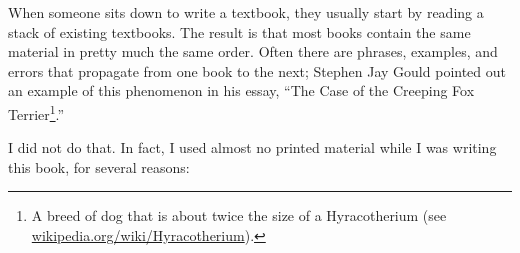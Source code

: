 \documentclass[12pt]{book}
\begin{document}













When someone sits down to
write a textbook, they usually start by reading a stack of existing
textbooks.  The result is that most books contain the same material in
pretty much the same order.  Often there are phrases, examples,
and errors that propagate from one book to the next;  Stephen Jay
Gould pointed out an example of this phenomenon in his
essay, ``The Case of the Creeping Fox Terrier\footnote{A breed of dog
  that is about twice the size of a Hyracotherium (see
  \url{wikipedia.org/wiki/Hyracotherium}).}.''

I did not do that.  In fact, I used almost no printed material while I
was writing this book, for several reasons:
\end{document}
